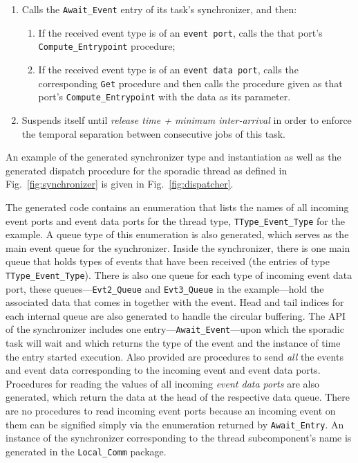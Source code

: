 \begin{enumerate}
\item{Calls the \texttt{Await\_Event} entry of its task's
  synchronizer, and then:
  \begin{enumerate}
  \item{If the received event type is of an \texttt{event port}, calls
    the that port's \texttt{Compute\_Entrypoint} procedure;}
  \item{If the received event type is of an \texttt{event data port},
    calls the corresponding \texttt{Get} procedure and then calls the
    procedure given as that port's \texttt{Compute\_Entrypoint} with
    the data as its parameter.}
  \end{enumerate}}
\item{Suspends itself until \emph{release time + minimum
    inter-arrival} in order to enforce the temporal separation
  between consecutive jobs of this task.}
\end{enumerate}

An example of the generated synchronizer type and instantiation as
well as the generated dispatch procedure for the sporadic thread as
defined in Fig.~\ref{fig:synchronizer} is given in
Fig.~\ref{fig:dispatcher}.

The generated code contains an enumeration that lists the names of all
incoming event ports and event data ports for the thread type,
\texttt{TType\_Event\_Type} for the example. A queue type of this
enumeration is also generated, which serves as the main event queue
for the synchronizer. Inside the synchronizer, there is one main queue
that holds types of events that have been received (the entries of
type \texttt{TType\_Event\_Type}). There is also one queue for each
type of incoming event data port, these queues---\texttt{Evt2\_Queue}
and \texttt{Evt3\_Queue} in the example---hold the associated data
that comes in together with the event. Head and tail indices for each
internal queue are also generated to handle the circular
buffering. The API of the synchronizer includes one
entry---\texttt{Await\_Event}---upon which the sporadic task will wait
and which returns the type of the event and the instance of time the
entry started execution. Also provided are procedures to send
\emph{all} the events and event data corresponding to the incoming
event and event data ports. Procedures for reading the values of all
incoming \emph{event data ports} are also generated, which return the
data at the head of the respective data queue. There are no procedures
to read incoming event ports because an incoming event on them can be
signified simply via the enumeration returned by
\texttt{Await\_Entry}. An instance of the synchronizer corresponding
to the thread subcomponent's name is generated in the
\texttt{Local\_Comm} package.

